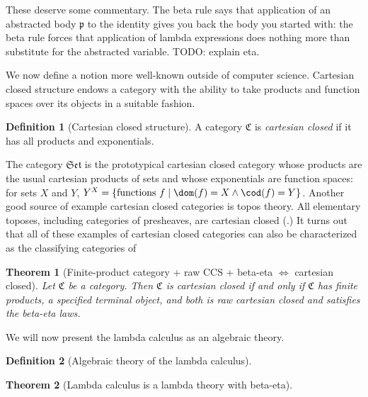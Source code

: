 \documentclass[12pt,twoside]{reedthesis}
\theoremstyle{definition}
\newtheorem{definition}{Definition}
\theoremstyle{remark}
\theoremstyle{plain}
\newtheorem{theorem}{Theorem}
\newcommand{\catset}{\mathfrak{Set}}
\begin{document}
These deserve some commentary. The beta rule says that application of an
abstracted body $\mathfrak{p}$ to the identity gives you back the body you
started with: the beta rule forces that application of lambda expressions does
nothing more than substitute for the abstracted variable. TODO: explain eta.

We now define a notion more well-known outside of computer science. Cartesian
closed structure endows a category with the ability to take products and
function spaces over its objects in a suitable fashion.
\begin{definition}[Cartesian closed structure]
  A category \( \mathfrak{C} \) is \emph{cartesian closed} if it has all
  products and exponentials.
\end{definition}

The category \( \catset \) is the prototypical cartesian closed category whose
products are the usual cartesian products of sets and whose exponentials are
function spaces: for sets $X$ and $Y$, \( Y^{X} = \{ \textrm{functions
} f \mid \dom(f) = X \wedge \cod(f) = Y \}\). Another good source of example cartesian
closed categories is topos theory. All elementary toposes, including categories
of presheaves, are cartesian closed (\cite{leinster_informal_2011}.) It turns
out that all of these examples of cartesian closed categories can also be
characterized as the classifying categories of

\begin{theorem}[Finite-product category + raw CCS + beta-eta $\iff$ cartesian closed]
  Let \( \mathfrak{C} \) be a category. Then \( \mathfrak{C}\) is cartesian
  closed if and only if \( \mathfrak{C} \) has finite products, a specified
  terminal object, and both is raw cartesian closed and satisfies the beta-eta
  laws.
\end{theorem}

We will now present the lambda calculus as an algebraic theory.

\begin{definition}[Algebraic theory of the lambda calculus]
\end{definition}

\begin{theorem}[Lambda calculus is a lambda theory with beta-eta]
\end{theorem}
\end{document}
